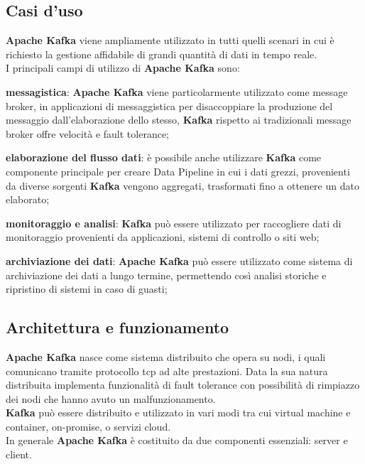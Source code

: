 \subsection{Casi d'uso}
\textbf{Apache Kafka} viene ampliamente utilizzato in tutti quelli scenari in cui è richiesto la gestione 
affidabile di grandi quantità di dati in tempo reale.\\
I principali campi di utilizzo di \textbf{Apache Kafka} sono:
\begin{list}{*}
    \item \textbf{messagistica}: \textbf{Apache Kafka} viene particolarmente utilizzato come \gls{message broker}{}, in applicazioni di messaggistica 
    per disaccoppiare la produzione del messaggio dall'elaborazione dello stesso, \textbf{Kafka} rispetto ai tradizionali \gls{message broker}{} offre velocità e \gls{fault tolerance}{};
    \item \item \textbf{elaborazione del flusso dati}: è possibile anche utilizzare \textbf{Kafka} come componente principale per creare \gls{Data Pipeline}{} in cui i dati grezzi,
    provenienti da diverse sorgenti \textbf{Kafka} vengono aggregati, trasformati fino a ottenere un dato elaborato;
    \item \textbf{monitoraggio e analisi}: \textbf{Kafka} può essere utilizzato per raccogliere dati di monitoraggio provenienti da applicazioni, sistemi di controllo o siti web; 
    \item \textbf{archiviazione dei dati}: \textbf{Apache Kafka} può essere utilizzato come sistema di archiviazione dei dati a lungo termine, permettendo così analisi storiche e ripristino di sistemi 
    in caso di guasti;

\end{list}
\subsection{Architettura e funzionamento}
\textbf{Apache Kafka} nasce come sistema distribuito che opera su nodi, i quali comunicano tramite protocollo
\gls{tcp}{} ad alte prestazioni. Data la sua natura distribuita implementa funzionalità di \gls{fault tolerance}{} con possibilità di rimpiazzo dei nodi che hanno avuto un malfunzionamento.\\  
\textbf{Kafka} può essere distribuito e utilizzato in vari modi tra cui \gls{virtual machine}{} e \gls{container}{}, \gls{on-promise}{}, o servizi cloud.\\
In generale \textbf{Apache Kafka} è costituito da due componenti essenziali: server e client.
